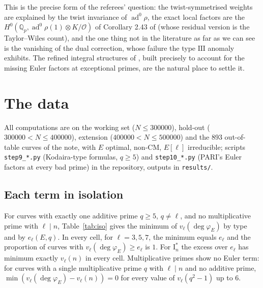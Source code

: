 \documentclass[11pt]{amsart}
\theoremstyle{definition}
\newcommand{\Q}{\mathbb{Q}}\newcommand{\Z}{\mathbb{Z}}\newcommand{\F}{\mathbb{F}}
\newcommand{\degphi}{\deg\varphi_E}\newcommand{\Gal}{\operatorname{Gal}}\newcommand{\ad}{\operatorname{ad}^0}
\begin{document}
This is the precise form of the referees' question: the twist-symmetrised weights are explained by the twist invariance of $\ad\rho$, the exact local factors are the $H^0(\Q_p,\ad\rho(1)\otimes K/\mathcal{O})$ of Corollary 2.43 of \cite{DDT} (whose residual version is the Taylor--Wiles count), and the one thing not in the literature as far as we can see is the vanishing of the dual correction, whose failure the type $\mathrm{III}$ anomaly exhibits. The refined integral structures of \cite[\S1.8]{DFG04}, built precisely to account for the missing Euler factors at exceptional primes, are the natural place to settle it.

\section{The data}\label{sec:data}

All computations are on the working set ($N\le300000$), hold-out ($300000<N\le400000$), extension ($400000<N\le500000$) and the $893$ out-of-table curves of the note, with $E$ optimal, non-CM, $E[\ell]$ irreducible; scripts \texttt{step9\_*.py} (Kodaira-type formulas, $q\ge5$) and \texttt{step10\_*.py} (PARI's Euler factors at every bad prime) in the repository, outputs in \texttt{results/}.

\subsection{Each term in isolation}
For curves with exactly one additive prime $q\ge5$, $q\ne\ell$, and no multiplicative prime with $\ell\mid n$, Table~\ref{tab:iso} gives the minimum of $v_\ell(\degphi)$ by type and by $e_\ell(E,q)$. In every cell, for $\ell=3,5,7$, the minimum equals $e_\ell$ and the proportion of curves with $v_\ell(\degphi)\ge e_\ell$ is $1$. For $\mathrm{I}_n^*$ the excess over $e_\ell$ has minimum exactly $v_\ell(n)$ in every cell. Multiplicative primes show no Euler term: for curves with a single multiplicative prime $q$ with $\ell\mid n$ and no additive prime, $\min(v_\ell(\degphi)-v_\ell(n))=0$ for every value of $v_\ell(q^2-1)$ up to $6$.
\end{document}

